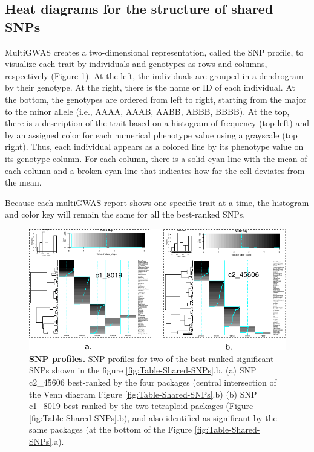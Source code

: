\documentclass{article}
\begin{document}
 
\subsection{Heat diagrams for the structure of shared SNPs}

MultiGWAS creates a two-dimensional representation, called the SNP profile, to visualize each trait by individuals and genotypes as rows and columns, respectively (Figure \ref{fig:SNP-profiles}). At the left, the individuals are grouped in a dendrogram by their genotype. At the right, there
is the name or ID of each individual. At the bottom, the genotypes are ordered from left to right, starting from the major to the minor allele (i.e., AAAA, AAAB, AABB, ABBB, BBBB). At the top, there is a description of the trait based on a histogram of frequency (top left) and by an assigned color for each numerical phenotype value using a grayscale (top right). Thus, each individual appears as a
colored line by its phenotype value on its genotype column. For each column, there is a solid cyan line with the mean of each column and a broken cyan line that indicates how far the cell deviates from the
mean.

Because each multiGWAS report shows one specific trait at a time, the histogram and color key will remain the same for all the best-ranked
SNPs.

\begin{figure}[H]
\begin{centering}
\includegraphics{images/paper-heat-maps}
\par\end{centering}
\caption{\textbf{\scriptsize{}SNP profiles. }{\scriptsize{}SNP profiles for
two of the best-ranked significant SNPs shown in the figure \ref{fig:Table-Shared-SNPs}.b.
(a) SNP c2\_45606 best-ranked by the four packages (central intersection
of the Venn diagram Figure \ref{fig:Table-Shared-SNPs}.b) (b) SNP
c1\_8019 best-ranked by the two tetraploid packages (Figure \ref{fig:Table-Shared-SNPs}.b),
and also identified as significant by the same packages (at the bottom
of the Figure \ref{fig:Table-Shared-SNPs}.a). \label{fig:SNP-profiles}}}
\end{figure}
\end{document}
